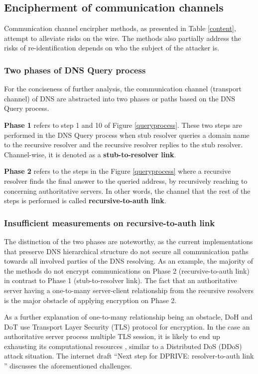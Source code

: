 \subsection{Encipherment of communication channels}
Communication channel encirpher methods, as presented in Table \ref{content}, attempt to alleviate risks on the wire. The methods also partially address the risks of re-identification depends on who the subject of the attacker is. 

\subsubsection{Two phases of DNS Query process}
For the conciseness of further analysis, the communication channel (transport channel) of DNS are abstracted into two phases or paths based on the DNS Query process.

\textbf{Phase 1} refers to step 1 and 10 of Figure \ref{queryprocess}. These two steps are performed in the DNS Query process when stub resolver queries a domain name to the recursive resolver and the recursive resolver replies to the stub resolver.
Channel-wise, it is denoted as a \textbf{stub-to-resolver link}.

\textbf{Phase 2} refers to the steps in the Figure \ref{queryprocess} where a recursive resolver finds the final answer to the queried address, by recursively reaching to concerning authoritative servers. In other words, the channel that the rest of the steps is performed is called \textbf{recursive-to-auth link}.

\subsubsection{Insufficient measurements on recursive-to-auth link}
The distinction of the two phases are noteworthy, as the current implementations that preserve DNS hierarchical structure do not secure all communication paths towards all involved parties of the DNS resolving.
As an example, the majority of the methods do not encrypt communications on Phase 2 (recursive-to-auth link) in contrast to Phase 1 (stub-to-resolver link).
The fact that an authoritative server having a one-to-many server-client relationship from the recursive resolvers is the major obstacle of applying encryption on Phase 2.

As a further explanation of one-to-many relationship being an obstacle, DoH \cite{rfc8484} and DoT \cite{hu2016specification} use Transport Layer Security (TLS) protocol \cite{rfc7858} for encryption. In the case an authoritative server process multiple TLS session, it is likely to end up exhausting its computational resources \cite{bhople2012server}, similar to a Distributed DoS (DDoS) attack situation. The internet draft ``Next step for DPRIVE: resolver-to-auth link \cite{I-D.bortzmeyer-dprive-step-2}'' discusses the aforementioned challenges.

